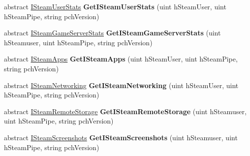 \begin{DoxyCompactItemize}
\mbox{\label{class_valve_1_1_steamworks_1_1_i_steam_client_a76f255df0ff9f7796317045bb3ad973a}} 
abstract \hyperlink{class_valve_1_1_steamworks_1_1_i_steam_user_stats}{I\+Steam\+User\+Stats} {\bfseries Get\+I\+Steam\+User\+Stats} (uint h\+Steam\+User, uint h\+Steam\+Pipe, string pch\+Version)
\item 
\mbox{\label{class_valve_1_1_steamworks_1_1_i_steam_client_a5052facd9e3effddd383e468f7413381}} 
abstract \hyperlink{class_valve_1_1_steamworks_1_1_i_steam_game_server_stats}{I\+Steam\+Game\+Server\+Stats} {\bfseries Get\+I\+Steam\+Game\+Server\+Stats} (uint h\+Steamuser, uint h\+Steam\+Pipe, string pch\+Version)
\item 
\mbox{\label{class_valve_1_1_steamworks_1_1_i_steam_client_ad95bd01bd0c9c831638f225981e8cc2b}} 
abstract \hyperlink{class_valve_1_1_steamworks_1_1_i_steam_apps}{I\+Steam\+Apps} {\bfseries Get\+I\+Steam\+Apps} (uint h\+Steam\+User, uint h\+Steam\+Pipe, string pch\+Version)
\item 
\mbox{\label{class_valve_1_1_steamworks_1_1_i_steam_client_aa6e3627d0eb28df7c009000ba6901f76}} 
abstract \hyperlink{class_valve_1_1_steamworks_1_1_i_steam_networking}{I\+Steam\+Networking} {\bfseries Get\+I\+Steam\+Networking} (uint h\+Steam\+User, uint h\+Steam\+Pipe, string pch\+Version)
\item 
\mbox{\label{class_valve_1_1_steamworks_1_1_i_steam_client_aa4f61cb9c372f7730d224be2687cc034}} 
abstract \hyperlink{class_valve_1_1_steamworks_1_1_i_steam_remote_storage}{I\+Steam\+Remote\+Storage} {\bfseries Get\+I\+Steam\+Remote\+Storage} (uint h\+Steamuser, uint h\+Steam\+Pipe, string pch\+Version)
\item 
\mbox{\label{class_valve_1_1_steamworks_1_1_i_steam_client_aa5b8b625e9aa81b4085d14b1ff49d555}} 
abstract \hyperlink{class_valve_1_1_steamworks_1_1_i_steam_screenshots}{I\+Steam\+Screenshots} {\bfseries Get\+I\+Steam\+Screenshots} (uint h\+Steamuser, uint h\+Steam\+Pipe, string pch\+Version)
\item 

\end{DoxyCompactItemize}
